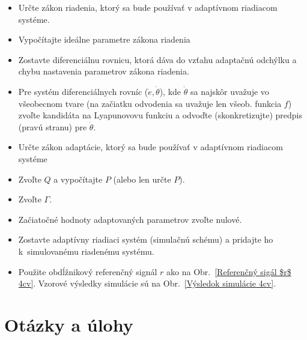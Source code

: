 \documentclass[a4paper, 10pt, ]{article}
\begin{document}
\begin{enumerate}[leftmargin=0pt, labelsep=4mm, itemsep=0pt]
    \begin{itemize}[leftmargin=0pt, labelsep=4mm, itemsep=0pt]
    	\item Určte zákon riadenia, ktorý sa bude používať v adaptívnom riadiacom systéme.
    	\item Vypočítajte ideálne parametre zákona riadenia
    	\item Zostavte diferenciálnu rovnicu, ktorá dáva do vzťahu adaptačnú odchýlku a chybu nastavenia parametrov zákona riadenia.
    	\item Pre systém diferenciálnych rovníc ($\dot e, \dot \theta$), kde $\dot \theta$ sa najskôr uvažuje vo všeobecnom tvare (na začiatku odvodenia sa uvažuje len všeob. funkcia $f$) zvoľte kandidáta na Lyapunovovu funkciu a odvoďte (skonkretizujte) predpis (pravú stranu) pre $\dot \theta$.
    	\item Určte zákon adaptácie, ktorý sa bude používať v adaptívnom riadiacom systéme
    	\item Zvoľte $Q$ a vypočítajte $P$ (alebo len určte $P$).
    	\item Zvoľte $\Gamma$.
    	\item Začiatočné hodnoty adaptovaných parametrov zvoľte nulové.
    	\item Zostavte adaptívny riadiaci systém (simulačnú schému) a pridajte ho k~simulovanému riadenému systému.
    	\item Použite obdĺžnikový referenčný signál $r$ ako na Obr.~\ref{Referenčný sigál $r$ 4cv}. Vzorové výsledky simulácie sú na Obr.~\ref{Výsledok simulácie 4cv}.
    \end{itemize}






\end{enumerate}

















\section{Otázky a úlohy}
\end{document}
